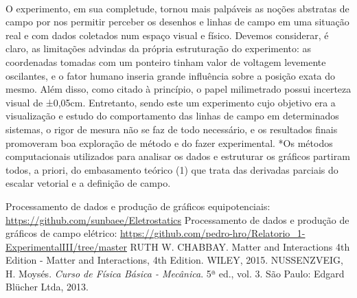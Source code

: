 \documentclass[column,brazilian,12pt,a4paper,final]{article}
\begin{document}
\paragraph{}
O experimento, em sua completude, tornou mais palpáveis as noções abstratas de campo por nos permitir perceber os desenhos e linhas de campo em uma situação real e com dados coletados num espaço visual e físico. Devemos considerar, é claro, as limitações advindas da própria estruturação do experimento: as coordenadas tomadas com um ponteiro tinham valor de voltagem levemente oscilantes, e o fator humano inseria grande influência sobre a posição exata do mesmo. Além disso, como citado à princípio, o papel milimetrado possui incerteza visual de ±0,05cm. Entretanto, sendo este um experimento cujo objetivo era a visualização e estudo do comportamento das linhas de campo em determinados sistemas, o rigor de mesura não se faz de todo necessário, e os resultados finais promoveram boa exploração de método e do fazer experimental. *Os métodos computacionais utilizados para analisar os dados e estruturar os gráficos partiram todos, a priori, do embasamento teórico (1) que trata das derivadas parciais do escalar vetorial e a definição de campo. 

\begin{thebibliography}{99}

\bibitem{}
Processamento de dados e produção de gráficos equipotenciais:
\url{https://github.com/sunbaee/Eletrostatics}
\bibitem{}
Processamento de dados e produção de gráficos de campo elétrico:
\url{https://github.com/pedro-hro/Relatorio_1-ExperimentalIII/tree/master}
\bibitem{}
RUTH W. CHABBAY. Matter and Interactions 4th Edition - Matter and Interactions, 4th Edition. WILEY, 2015.
\bibitem{}
NUSSENZVEIG, H. Moysés. {\em Curso de Física Básica - Mecânica}. 5ª ed., vol. 3. São Paulo: Edgard Blücher Ltda, 2013.

\end{thebibliography}
\end{document}
